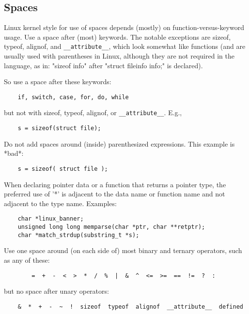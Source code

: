 \documentclass[pdftex,12pt, twocol]{article} %
\begin{document}
\subsection{Spaces}

Linux kernel style for use of spaces depends (mostly) on
function-versus-keyword usage.  Use a space after (most) keywords.  The
notable exceptions are sizeof, typeof, alignof, and \verb+__attribute__+, which look
somewhat like functions (and are usually used with parentheses in Linux,
although they are not required in the language, as in: "sizeof info" after
"struct fileinfo info;" is declared).

So use a space after these keywords:

\begin{verbatim}
	if, switch, case, for, do, while
\end{verbatim}

but not with sizeof, typeof, alignof, or \verb+__attribute__+.  E.g.,

\begin{verbatim}
	s = sizeof(struct file);
\end{verbatim}

Do not add spaces around (inside) parenthesized expressions.  This example is
*bad*:

\begin{verbatim}
	s = sizeof( struct file );
\end{verbatim}

When declaring pointer data or a function that returns a pointer type, the
preferred use of '*' is adjacent to the data name or function name and not
adjacent to the type name.  Examples:

\begin{verbatim}
	char *linux_banner;
	unsigned long long memparse(char *ptr, char **retptr);
	char *match_strdup(substring_t *s);
\end{verbatim}

Use one space around (on each side of) most binary and ternary operators,
such as any of these:

\begin{verbatim}
        =  +  -  <  >  *  /  %  |  &  ^  <=  >=  ==  !=  ?  :
\end{verbatim}

but no space after unary operators:

\begin{verbatim}
	&  *  +  -  ~  !  sizeof  typeof  alignof  __attribute__  defined
\end{verbatim}
\end{document}
